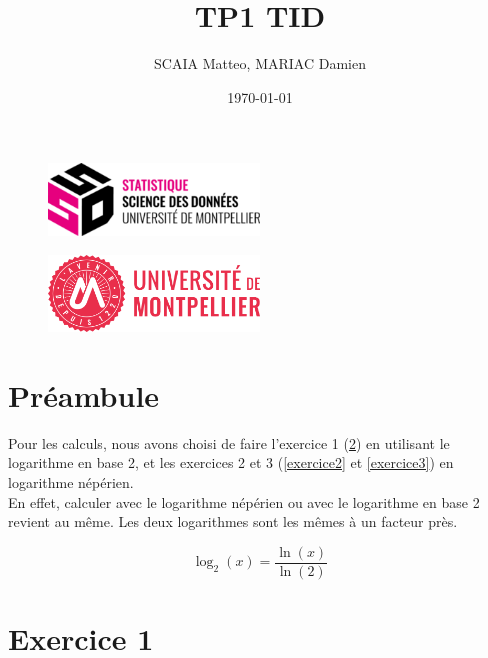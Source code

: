 \documentclass{article}
\title{TP1 TID}
\author{SCAIA Matteo, MARIAC Damien}
\date{\today}
\begin{document}
\maketitle

\begin{figure}[h] 
    \centering
    \includegraphics[width=0.5\textwidth]{ssd_logo.png} 
\end{figure}

\begin{figure}[h] 
    \centering
    \includegraphics[width=0.5\textwidth]{logo_um_2022_rouge_RVB.png} 
\end{figure}

\newpage

\setcounter{section}{-1}
\tableofcontents

\newpage
\section{Préambule}
Pour les calculs, nous avons choisi de faire l'exercice 1 (\ref{Exercice1}) en utilisant le logarithme en base 2, et les exercices 2 et 3 (\ref{exercice2} et \ref{exercice3}) en logarithme népérien.\\
En effet, calculer avec le logarithme népérien ou avec le logarithme en base 2 revient au même. Les deux logarithmes sont les mêmes à un facteur près.


\[
\log_2(x) = \frac{\ln(x)}{\ln(2)}
\]


\section{Exercice 1}
\label{Exercice1}
\end{document}
